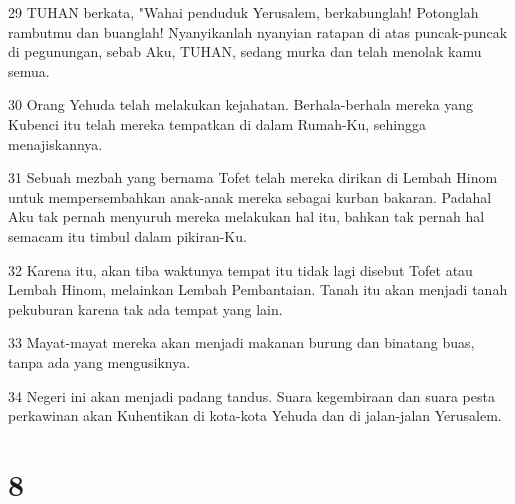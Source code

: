 \par 29 TUHAN berkata, "Wahai penduduk Yerusalem, berkabunglah! Potonglah rambutmu dan buanglah! Nyanyikanlah nyanyian ratapan di atas puncak-puncak di pegunungan, sebab Aku, TUHAN, sedang murka dan telah menolak kamu semua.
\par 30 Orang Yehuda telah melakukan kejahatan. Berhala-berhala mereka yang Kubenci itu telah mereka tempatkan di dalam Rumah-Ku, sehingga menajiskannya.
\par 31 Sebuah mezbah yang bernama Tofet telah mereka dirikan di Lembah Hinom untuk mempersembahkan anak-anak mereka sebagai kurban bakaran. Padahal Aku tak pernah menyuruh mereka melakukan hal itu, bahkan tak pernah hal semacam itu timbul dalam pikiran-Ku.
\par 32 Karena itu, akan tiba waktunya tempat itu tidak lagi disebut Tofet atau Lembah Hinom, melainkan Lembah Pembantaian. Tanah itu akan menjadi tanah pekuburan karena tak ada tempat yang lain.
\par 33 Mayat-mayat mereka akan menjadi makanan burung dan binatang buas, tanpa ada yang mengusiknya.
\par 34 Negeri ini akan menjadi padang tandus. Suara kegembiraan dan suara pesta perkawinan akan Kuhentikan di kota-kota Yehuda dan di jalan-jalan Yerusalem.

\chapter{8}

